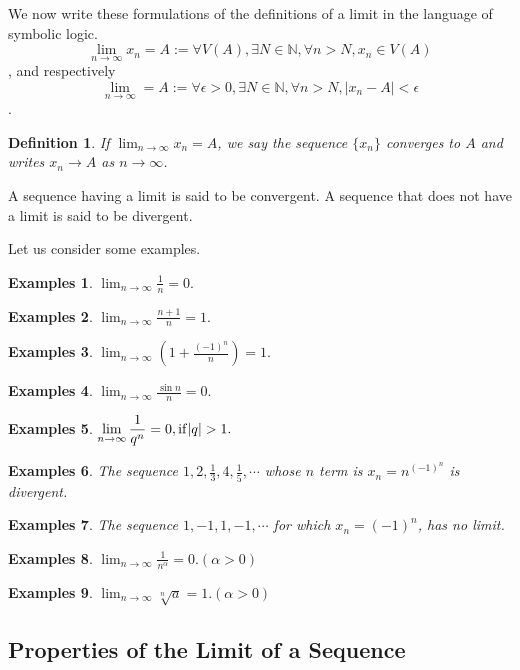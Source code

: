 \documentclass[a4paper,12pt]{article} %
\newtheorem{definition}{Definition}[section]
\newtheorem{example}{Examples}
\begin{document}
We now write these formulations of the definitions of a limit in the 
language of symbolic logic.
\[\lim_{n \to \infty} x_n = A := \forall V(A), \exists N \in \mathbb{N}, \forall n>N, x_n \in V(A)\],
and respectively
\[\lim_{n \to \infty } = A := \forall \epsilon >0, \exists N\in \mathbb{N}, \forall n>N, |x_n - A|<\epsilon\].
\begin{definition}
    If $\displaystyle \lim_{n \to \infty} x_n = A$, we say the sequence $\{x_n\}$ 
    converges to $A$ and writes $x_n \to A$ as $n \to \infty$.
\end{definition}

A sequence having a limit is said to be convergent. A sequence that does not 
have a limit is said to be divergent.

Let us consider some examples.
\begin{example}
    $\displaystyle \lim_{n \to \infty} \frac{1}{n} = 0.$
\end{example}
\begin{example}
    $\displaystyle \lim_{n \to \infty} \frac{n+1}{n} = 1.$
\end{example}
\begin{example}
    $\displaystyle \lim_{n \to \infty} \left( 1+\frac{(-1)^n}{n}\right) = 1.$
\end{example}
\begin{example}
    $\displaystyle \lim_{n \to \infty} \frac{\sin n}{n} = 0.$
\end{example}
\begin{example}
    $\displaystyle \lim_{n \to \infty} \frac{1}{q^n} = 0, {\rm if } |q|>1.$
\end{example}
\begin{example}
    The sequence $1, 2, \frac{1}{3}, 4, \frac{1}{5}, \cdots$ whose $n$
    term is $\displaystyle x_n = n^{(-1)^n}$ is divergent. 
\end{example}
\begin{example}
    The sequence $1, -1, 1, -1, \cdots$ for which $x_n = (-1)^n$, has no limit.
\end{example}
\begin{example}
    $\displaystyle \lim_{n \to \infty} \frac{1}{n^{\alpha}} = 0. (\alpha>0)$
\end{example}
\begin{example}
    $\displaystyle \lim_{n \to \infty}\sqrt[n]{a}  = 1. (\alpha>0)$
\end{example}

\subsection{Properties of the Limit of a Sequence}
\end{document}
